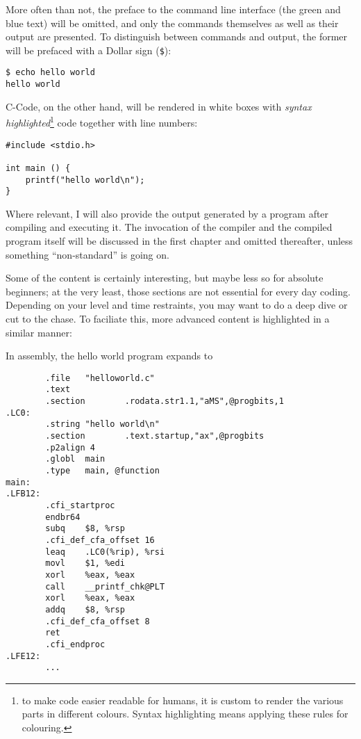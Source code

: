 More often than not, the preface to the command line interface (the green and blue text) will be omitted, and only the commands themselves as well as their output are presented. To distinguish between commands and output, the former will be prefaced with a Dollar sign (\texttt{\$}):

\begin{cmdbox}
\texttt{\$ echo hello world} \\
\texttt{hello world}
\end{cmdbox}

C-Code, on the other hand, will be rendered in white boxes with \emph{syntax highlighted}\footnote{to make code easier readable for humans, it is custom to render the various parts in different colours. Syntax highlighting means applying these rules for colouring.} code together with line numbers:
\begin{codebox}[helloworld.c]
\begin{verbatim}
#include <stdio.h>

int main () {
    printf("hello world\n");
}
\end{verbatim}
\end{codebox}

Where relevant, I will also provide the output generated by a program after compiling and executing it. The invocation of the compiler and the compiled program itself will be discussed in the first chapter and omitted thereafter, unless something \enquote{non-standard} is going on.

Some of the content is certainly interesting, but maybe less so for absolute beginners; at the very least, those sections are not essential for every day coding. Depending on your level and time restraints, you may want to do a deep dive or cut to the chase. To faciliate this, more advanced content is highlighted in a similar manner:
\begin{plusbox}
In assembly, the hello world program expands to
\begin{codebox}[helloworld.s]
\begin{verbatim}
        .file   "helloworld.c"
        .text
        .section        .rodata.str1.1,"aMS",@progbits,1
.LC0:
        .string "hello world\n"
        .section        .text.startup,"ax",@progbits
        .p2align 4
        .globl  main
        .type   main, @function
main:
.LFB12:
        .cfi_startproc
        endbr64
        subq    $8, %rsp
        .cfi_def_cfa_offset 16
        leaq    .LC0(%rip), %rsi
        movl    $1, %edi
        xorl    %eax, %eax
        call    __printf_chk@PLT
        xorl    %eax, %eax
        addq    $8, %rsp
        .cfi_def_cfa_offset 8
        ret
        .cfi_endproc
.LFE12:
        ...
\end{verbatim}
\end{codebox}
\end{plusbox}


